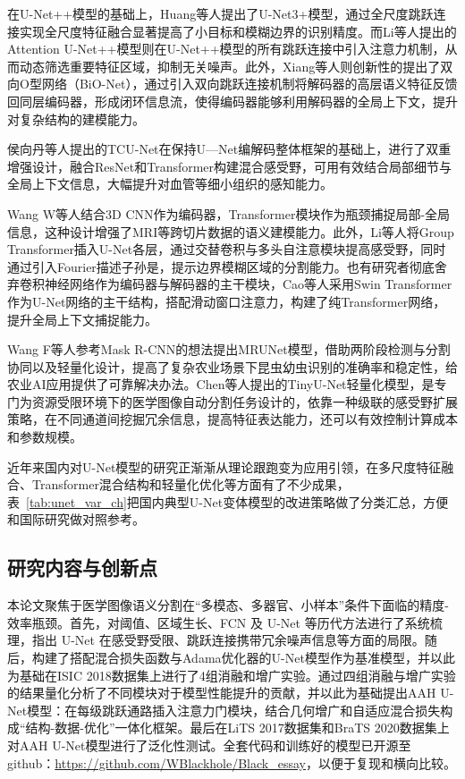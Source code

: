 在U-Net++模型的基础上，Huang等人\cite{huang2020}提出了U-Net3+模型，通过全尺度跳跃连接实现全尺度特征融合显著提高了小目标和模糊边界的识别精度。而Li等人\cite{li2020}提出的Attention U-Net++模型则在U-Net++模型的所有跳跃连接中引入注意力机制，从而动态筛选重要特征区域，抑制无关噪声。此外，Xiang等人\cite{xiang2020}则创新性的提出了双向O型网络（BiO-Net），通过引入双向跳跃连接机制将解码器的高层语义特征反馈回同层编码器，形成闭环信息流，使得编码器能够利用解码器的全局上下文，提升对复杂结构的建模能力。

侯向丹等人\cite{HouXiangDan2023}提出的TCU-Net在保持U—Net编解码整体框架的基础上，进行了双重增强设计，融合ResNet和Transformer构建混合感受野，可用有效结合局部细节与全局上下文信息，大幅提升对血管等细小组织的感知能力。

Wang W等人\cite{wang2021}结合3D CNN作为编码器，Transformer模块作为瓶颈捕捉局部-全局信息，这种设计增强了MRI等跨切片数据的语义建模能力。此外，Li等人\cite{li2021}将Group Transformer插入U-Net各层，通过交替卷积与多头自注意模块提高感受野，同时通过引入Fourier描述子孙是，提示边界模糊区域的分割能力。也有研究者彻底舍弃卷积神经网络作为编码器与解码器的主干模块，Cao等人\cite{cao2021}采用Swin Transformer作为U-Net网络的主干结构，搭配滑动窗口注意力，构建了纯Transformer网络，提升全局上下文捕捉能力。

Wang F等人\cite{Wang2023T}参考Mask R-CNN的想法提出MRUNet模型，借助两阶段检测与分割协同以及轻量化设计，提高了复杂农业场景下昆虫幼虫识别的准确率和稳定性，给农业AI应用提供了可靠解决办法。Chen等人\cite{chen2024}提出的TinyU-Net轻量化模型，是专门为资源受限环境下的医学图像自动分割任务设计的，依靠一种级联的感受野扩展策略，在不同通道间挖掘冗余信息，提高特征表达能力，还可以有效控制计算成本和参数规模。

近年来国内对U-Net模型的研究正渐渐从理论跟跑变为应用引领，在多尺度特征融合、Transformer混合结构和轻量化优化等方面有了不少成果，表~\ref{tab:unet_var_ch}把国内典型U-Net变体模型的改进策略做了分类汇总，方便和国际研究做对照参考。

\subsection{研究内容与创新点}

本论文聚焦于医学图像语义分割在“多模态、多器官、小样本”条件下面临的精度-效率瓶颈。首先，对阈值、区域生长、FCN 及 U-Net 等历代方法进行了系统梳理，指出 U-Net 在感受野受限、跳跃连接携带冗余噪声信息等方面的局限。随后，构建了搭配混合损失函数与Adama优化器的U-Net模型作为基准模型，并以此为基础在ISIC 2018数据集上进行了4组消融和增广实验。通过四组消融与增广实验的结果量化分析了不同模块对于模型性能提升的贡献，并以此为基础提出AAH U-Net模型：在每级跳跃通路插入注意力门模块，结合几何增广和自适应混合损失构成“结构-数据-优化”一体化框架。最后在LiTS 2017数据集和BraTS 2020数据集上对AAH U-Net模型进行了泛化性测试。全套代码和训练好的模型已开源至github：\url{https://github.com/WBlackhole/Black_essay}，以便于复现和横向比较。


